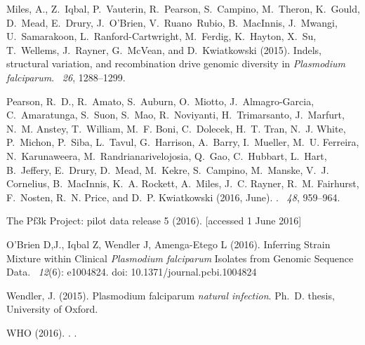 \documentclass{bioinfo}
\begin{document}
\begin{thebibliography}{}
Miles, A., Z.~Iqbal, P.~Vauterin, R.~Pearson, S.~Campino, M.~Theron, K.~Gould,
  D.~Mead, E.~Drury, J.~O{\textquoteright}Brien, V.~Ruano~Rubio, B.~MacInnis,
  J.~Mwangi, U.~Samarakoon, L.~Ranford-Cartwright, M.~Ferdig, K.~Hayton, X.~Su,
  T.~Wellems, J.~Rayner, G.~McVean, and D.~Kwiatkowski (2015).
\newblock Indels, structural variation, and recombination drive genomic diversity in {\it Plasmodium falciparum}.
~{\em26\/}, 1288--1299.

Pearson, R.~D., R.~Amato, S.~Auburn, O.~Miotto, J.~Almagro-Garcia,
  C.~Amaratunga, S.~Suon, S.~Mao, R.~Noviyanti, H.~Trimarsanto, J.~Marfurt,
  N.~M. Anstey, T.~William, M.~F. Boni, C.~Dolecek, H.~T. Tran, N.~J. White,
  P.~Michon, P.~Siba, L.~Tavul, G.~Harrison, A.~Barry, I.~Mueller, M.~U.
  Ferreira, N.~Karunaweera, M.~Randrianarivelojosia, Q.~Gao, C.~Hubbart,
  L.~Hart, B.~Jeffery, E.~Drury, D.~Mead, M.~Kekre, S.~Campino, M.~Manske,
  V.~J. Cornelius, B.~MacInnis, K.~A. Rockett, A.~Miles, J.~C. Rayner, R.~M.
  Fairhurst, F.~Nosten, R.~N. Price, and D.~P. Kwiatkowski (2016, June).
.
~{\em 48}, 959--964.

The Pf3k Project: pilot data release 5 (2016).
 [accessed 1 June 2016]

O'Brien D,J., Iqbal Z, Wendler J, Amenga-Etego L (2016). \newblock Inferring Strain Mixture within Clinical {\em Plasmodium falciparum} Isolates from Genomic Sequence Data. ~{\em 12\/}(6): e1004824. doi: 10.1371/journal.pcbi.1004824


Wendler, J. (2015).
 {P}lasmodium falciparum {\em natural infection}.
\newblock Ph.\ D. thesis, University of Oxford.

WHO (2016).
.
.

\end{thebibliography}
\end{document}
